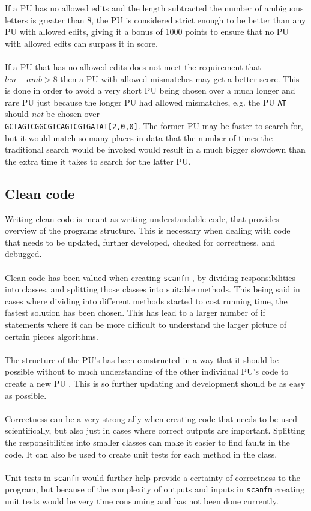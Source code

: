 \documentclass[12pt]{article}
\newcommand{\sfm}{\texttt{scanfm} }
\newcommand{\pu}{PU }
\newcommand{\pus}{PU's }
\newcommand{\pup}{PU. }
\begin{document}
If a \pu has no allowed edits and the length subtracted the number of ambiguous letters is greater than 8, 
the \pu is considered strict enough to be better than any \pu with allowed edits, giving it a bonus of 1000 points to
ensure that no \pu with allowed edits can surpass it in score. \\ \\
If a \pu that has no allowed edits does not meet the requirement that $len-amb>8$ then a \pu with allowed
mismatches may get a better score. This is done in order to avoid a very short \pu being chosen over a much longer
and rare \pu just because the longer \pu had allowed mismatches, e.g. the \pu\; \texttt{AT}\; should \emph{not} be chosen
over \\
\texttt{GCTAGTCGGCGTCAGTCGTGATAT[2,0,0]}. The former \pu may be faster to search for, but it would match so many
places in data that the number of times the traditional search would be invoked would result in a much bigger
slowdown than the extra time it takes to search for the latter \pup
\subsection{Clean code}
Writing clean code is meant as writing understandable code, that provides overview of the programs
structure. This is necessary when dealing with code that needs to be updated, further developed,
checked for correctness, and debugged. \\ \\
Clean code has been valued when creating \sfm, by dividing responsibilities into classes, and splitting 
those classes into suitable methods. This being said in cases where dividing into different methods 
started to cost running time, the fastest solution has been chosen. This has lead to a larger number of if statements where it can be more difficult to understand the larger picture of certain pieces algorithms. \\ \\
The structure of the \pus has been constructed in a way that it should be possible without to much understanding of the other individual \pus code to create a new \pu. This is so further updating and
development should be as easy as possible. \\ \\
Correctness can be a very strong ally when creating code that needs to be used scientifically, but also
just in cases where correct outputs are important. Splitting the responsibilities into smaller classes 
can make it easier to find faults in the code. It can also be used to create unit tests for each method in
the class. \\ \\
Unit tests in \sfm would further help provide a certainty of correctness to the program, but because
of the complexity of outputs and inputs in \sfm creating unit tests would be very time consuming and
has not been done currently. 
\end{document}
